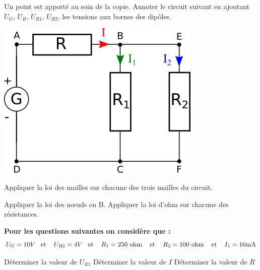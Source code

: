 \documentclass[11pt]{exam}		%
\title{\Titre}
\newcommand{\Titre}{} %
\begin{document}
\thispagestyle{headandfoot}

\section{\Titre} %

\headrule
\footrule
\setlength{\columnsep}{0.25cm}
\setlength{\columnseprule}{1pt}

\consignes



\begin{questions}
	\question[1] Un point est apporté au soin de la copie.
	\question[2] Annoter le circuit suivant en ajoutant $U_G$, $U_R$, $U_{R1}$, $U_{R2}$, les tensions aux bornes des dipôles.

	\begin{center}
		\includegraphics[scale = 2]{c1.png}
	\end{center}

	\question[3] Appliquer la loi des mailles sur chacune des trois mailles du circuit.

	\question[1] Appliquer la loi des n\oe uds en B.
	\clearpage
	\question[3] Appliquer la loi d'ohm sur chacune des résistances.

	\begin{center}
		\textbf{	Pour les questions suivantes on considère que :
		}
		\vspace{-5pt}
		$$U_G=10V \text{\phantom{a} et \phantom{a} } U_{R2}=4V \text{\phantom{a} et \phantom{a} }R_1=250\text{  ohm }\text{\phantom{a} et \phantom{a} }R_2=100\text{ ohm }\text{\phantom{a} et \phantom{a} }I_1=16\text{mA}$$
	\end{center}
	\question[3] Déterminer la valeur de $U_{R1}$
	\question[3] Déterminer la valeur de $I$
	\question[4] Déterminer la valeur de $R$

\end{questions}


\countpoint
\end{document}
